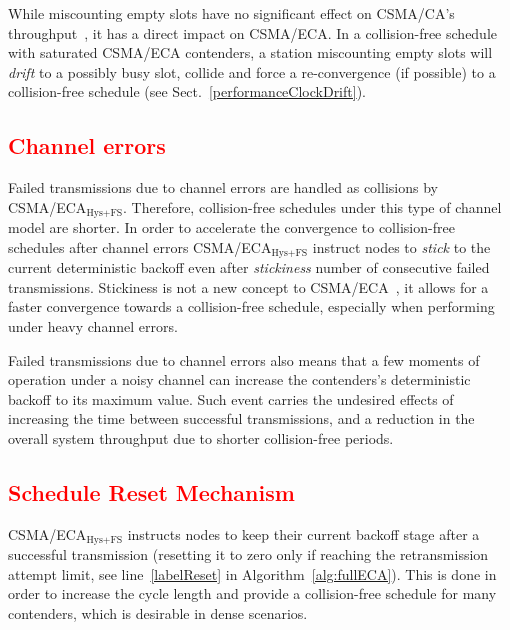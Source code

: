	While miscounting empty slots have no significant effect on CSMA/CA's throughput~\cite{slotDrift}, it has a direct impact on CSMA/ECA. In a collision-free schedule with saturated CSMA/ECA contenders, a station miscounting empty slots will \emph{drift} to a possibly busy slot, collide and force a re-convergence (if possible) to a collision-free schedule (see Sect.~\ref{performanceClockDrift}).
	
%	

	\textcolor{red}{\subsection{Channel errors}}\label{errorEffect}
	Failed transmissions due to channel errors are handled as collisions by CSMA/ECA$_{\text{Hys+FS}}$. Therefore, collision-free schedules under this type of channel model are shorter. In order to accelerate the convergence to collision-free schedules after channel errors CSMA/ECA$_{\text{Hys+FS}}$ instruct nodes to \emph{stick} to the current deterministic backoff even after \emph{stickiness} number of consecutive failed transmissions. Stickiness is not a new concept to CSMA/ECA~\cite{barcelo2011tcf}, it allows for a faster convergence towards a collision-free schedule, especially when performing under heavy channel errors.
	
	Failed transmissions due to channel errors also means that a few moments of operation under a noisy channel can increase the contenders's deterministic backoff to its maximum value. Such event carries the undesired effects of increasing the time between successful transmissions, and a reduction in the overall system throughput due to shorter collision-free periods.
		
	\textcolor{red}{\subsection{Schedule Reset Mechanism}\label{schedReset}}
	CSMA/ECA$_{\text{Hys+FS}}$ instructs nodes to keep their current backoff stage after a successful transmission (resetting it to zero only if reaching the retransmission attempt limit, see line~\ref{labelReset} in Algorithm~\ref{alg:fullECA}). This is done in order to increase the cycle length and provide a collision-free schedule for many contenders, which is desirable in dense scenarios.
	
